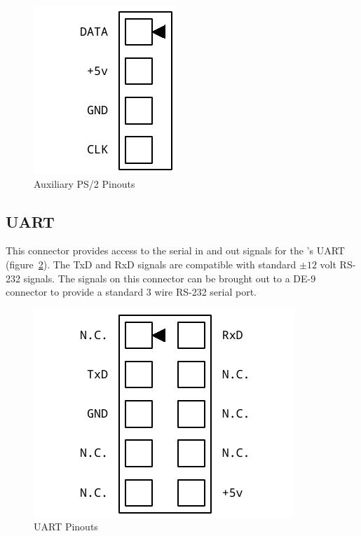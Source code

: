 \begin{figure}[ht]
    \begin{center}
        \includegraphics[scale=0.65]{images/f256_port_ps2.pdf}
    \end{center}
    \caption{Auxiliary PS/2 Pinouts}
    \label{fig:port_ps2}
\end{figure}

\subsection*{UART}

This connector provides access to the serial in and out signals for the \fjr's UART (figure~\ref{fig:port_uart}). The TxD and RxD signals are compatible with standard $\pm 12$ volt RS-232 signals. The signals on this connector can be brought out to a DE-9 connector to provide a standard 3 wire RS-232 serial port.

\begin{figure}[ht]
    \begin{center}
        \includegraphics[scale=0.65]{images/f256_port_uart.pdf}
    \end{center}
    \caption{UART Pinouts}
    \label{fig:port_uart}
\end{figure}

